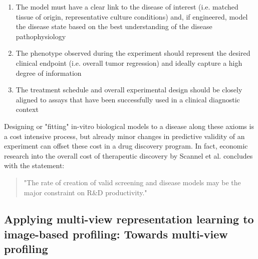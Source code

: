\begin{flushleft}
\begin{enumerate}
    \item The model must have a clear link to the disease of interest (i.e. matched tissue of origin, representative culture conditions) and, if engineered, model the disease state based on the best understanding of the disease pathophysiology
    \item The phenotype observed during the experiment should represent the desired clinical endpoint (i.e. overall tumor regression) and ideally capture a high degree of information
    \item The treatment schedule and overall experimental design should be closely aligned to assays that have been successfully used in a clinical diagnostic context
\end{enumerate}

Designing or "fitting" in-vitro biological models to a disease along these axioms is a cost intensive process, but already minor changes in predictive validity of an experiment can offset these cost in a drug discovery program. In fact, economic research into the overall cost of therapeutic discovery by Scannel et al. \citep{scannellWhenQualityBeats2016} concludes with the statement:

\begin{quote}
"The rate of creation of valid screening and disease models may be the major constraint on R\&D productivity."
\end{quote}

\subsection{Applying multi-view representation learning to image-based profiling: Towards multi-view profiling}


\end{flushleft}

